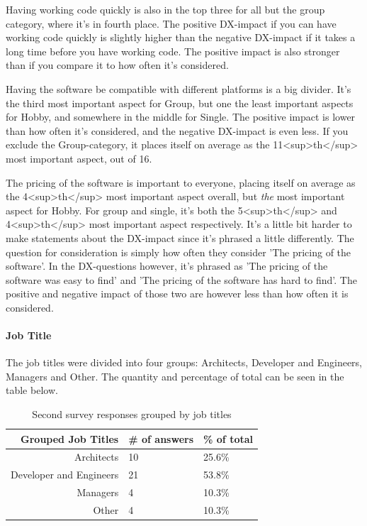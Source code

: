 \documentclass{article}
\begin{document}
Having working code quickly is also in the top three for all but the
group category, where it's in fourth place. The positive DX-impact if
you can have working code quickly is slightly higher than the negative
DX-impact if it takes a long time before you have working code. The
positive impact is also stronger than if you compare it to how often
it's considered.

Having the software be compatible with different platforms is a big
divider. It's the third most important aspect for Group, but one the
least important aspects for Hobby, and somewhere in the middle for
Single. The positive impact is lower than how often it's considered, and
the negative DX-impact is even less. If you exclude the Group-category,
it places itself on average as the 11<sup>th</sup> most important
aspect, out of 16.

The pricing of the software is important to everyone, placing itself on
average as the 4<sup>th</sup> most important aspect overall, but \textit{the}
most important aspect for Hobby. For group and single, it's both the
5<sup>th</sup> and 4<sup>th</sup> most important aspect respectively.
It's a little bit harder to make statements about the DX-impact since
it's phrased a little differently. The question for consideration is
simply how often they consider 'The pricing of the software'. In the
DX-questions however, it's phrased as 'The pricing of the software was
easy to find' and 'The pricing of the software has hard to find'. The
positive and negative impact of those two are however less than how
often it is considered.

\paragraph{Job Title}

The job titles were divided into four groups: Architects, Developer and
Engineers, Managers and Other. The quantity and percentage of total can
be seen in the table below.

\begin{table}[H]
\centering
\begin{tabularx}{\columnwidth}{r l l}
\textbf{Grouped Job Titles} &    \textbf{\# of answers} &     \textbf{\% of total} \\\hline
Architects & 10 & 25.6\%  \\ \hline
Developer and Engineers & 21 & 53.8\%  \\\hline
Managers & 4 & 10.3\%  \\\hline
Other                   & 4 & 10.3\%  \\\hline
\end{tabularx}
\caption{Second survey responses grouped by job titles}
\label{tab:my_label}
\end{table}
\end{document}

